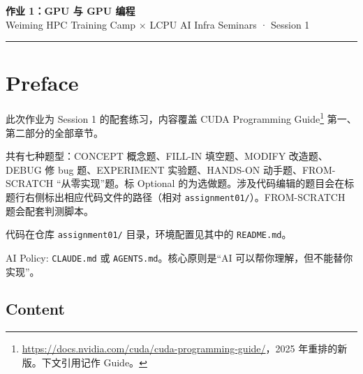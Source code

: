 \documentclass[11pt,a4paper,fontset=none]{ctexart}
\newcommand{\guide}{CUDA Programming Guide}
\begin{document}
\begin{center}
  {\LARGE\bfseries 作业 1：GPU 与 GPU 编程}\\[6pt]
  {\sffamily Weiming HPC Training Camp $\times$ LCPU AI Infra Seminars \; · \; Session 1}
\end{center}

\vspace{0.5em}
\hrule
\vspace{1em}

\section*{Preface}

此次作业为 Session 1 的配套练习，内容覆盖 \guide{}\footnote{\url{https://docs.nvidia.com/cuda/cuda-programming-guide/}，2025 年重排的新版。下文引用记作 Guide。} 第一、第二部分的全部章节。

共有七种题型：CONCEPT 概念题、FILL-IN 填空题、MODIFY 改造题、DEBUG 修 bug 题、EXPERIMENT 实验题、HANDS-ON 动手题、FROM-SCRATCH “从零实现”题。标 Optional 的为选做题。涉及代码编辑的题目会在标题行右侧标出相应代码文件的路径（相对 \texttt{assignment01/}）。FROM-SCRATCH 题会配套判测脚本。

代码在仓库 \texttt{assignment01/} 目录，环境配置见其中的 \texttt{README.md}。

AI Policy: \texttt{CLAUDE.md} 或 \texttt{AGENTS.md}。核心原则是“AI 可以帮你理解，但不能替你实现”。

\subsection*{Content}
\end{document}

